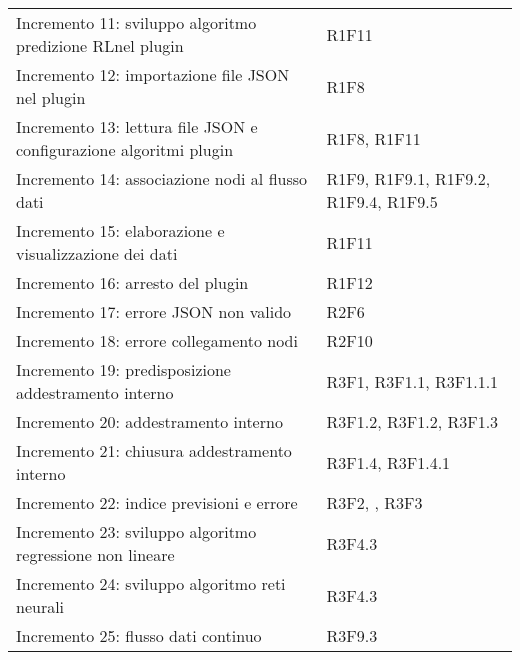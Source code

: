 \begin{longtable} {
		>{\raggedright\arraybackslash}p{85mm}
		>{\raggedleft\arraybackslash}p{40mm}
	}
	Incremento 11: sviluppo algoritmo predizione RL\glosp nel plugin &
	R1F11 \TBstrut \\ [2mm]
	
	Incremento 12: importazione file JSON nel plugin &
	R1F8 \TBstrut \\ [2mm]
	
	Incremento 13: lettura file JSON e configurazione algoritmi plugin &
	R1F8, R1F11 \TBstrut \\ [2mm]
	
	Incremento 14: associazione nodi al flusso dati &
	R1F9, R1F9.1, R1F9.2, R1F9.4, R1F9.5 \TBstrut \\ [2mm]
	
	Incremento 15: elaborazione e visualizzazione dei dati &
	R1F11 \TBstrut \\ [2mm]
	
	Incremento 16: arresto del plugin &
	R1F12 \TBstrut \\ [2mm]
	
	Incremento 17: errore JSON non valido &
	R2F6 \TBstrut \\ [2mm]
	
	Incremento 18: errore collegamento nodi &
	R2F10 \TBstrut \\ [2mm]
	
	Incremento 19: predisposizione addestramento interno &
	R3F1, R3F1.1, R3F1.1.1 \TBstrut \\ [2mm]
	
	Incremento 20: addestramento interno &
	R3F1.2, R3F1.2, R3F1.3 \TBstrut \\ [2mm]
	
	Incremento 21: chiusura addestramento interno &
	R3F1.4, R3F1.4.1 \TBstrut \\ [2mm]
	
	Incremento 22: indice previsioni e errore &
	R3F2, , R3F3 \TBstrut \\ [2mm]
	
	Incremento 23: sviluppo algoritmo regressione non lineare &
	R3F4.3 \TBstrut \\ [2mm]
	
	Incremento 24: sviluppo algoritmo reti neurali &
	R3F4.3 \TBstrut \\ [2mm]
	
	Incremento 25: flusso dati continuo &
	R3F9.3 \TBstrut \\ [2mm]
	
\end{longtable}

